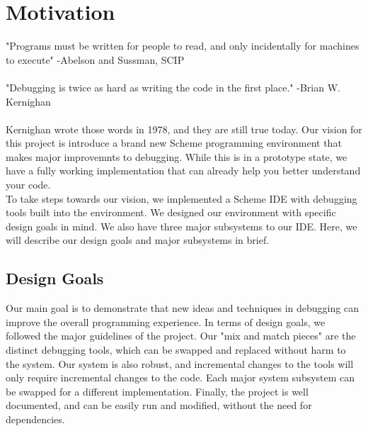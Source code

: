 \documentclass[10pt,journal,compsoc]{IEEEtran}
\begin{document}
		\section{Motivation}
		"Programs must be written for people to read, and only incidentally for machines to execute" -Abelson and Sussman, SCIP\\
		\\
		"Debugging is twice as hard as writing the code in the first place." -Brian W. Kernighan\\
        \\
        Kernighan wrote those words in 1978, and they are still true today. Our vision for this project is introduce a brand new Scheme programming environment that makes major improvemnts to debugging. While this is in a prototype state, we have a fully working implementation that can already help you better understand your code.
        \\
        To take steps towards our vision, we implemented a Scheme IDE with debugging tools built into the environment. We designed our environment with specific design goals in mind. We also have three major subsystems to our IDE. Here, we will describe our design goals and major subsystems in brief.
        
        \subsection{Design Goals}
        
        Our main goal is to demonstrate that new ideas and techniques in debugging can improve the overall programming experience. In terms of design goals, we followed the major guidelines of the project. Our "mix and match pieces" are the distinct debugging tools, which can be swapped and replaced without harm to the system. Our system is also robust, and incremental changes to the tools will only require incremental changes to the code. Each major system subsystem can be swapped for a different implementation. Finally, the project is well documented, and can be easily run and modified, without the need for dependencies.
        
\end{document}
